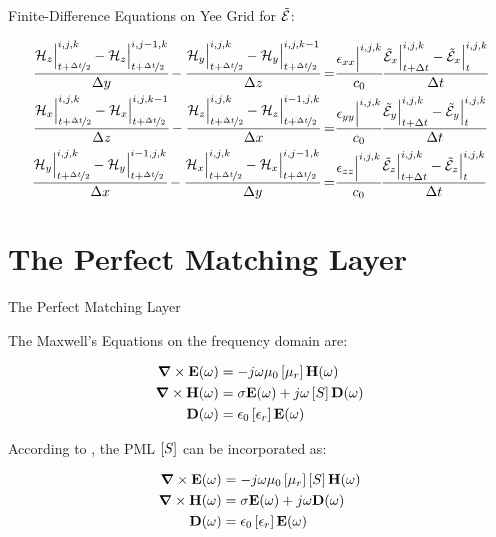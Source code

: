 \documentclass[aspectratio=169]{beamer}
\begin{document}
\begin{frame}{Finite-Difference Equations on Yee Grid}
  for $\tilde{\mathcal{E}}$:

  \begin{small}
      \begin{align}
          \cfrac{\mathcal{H}_z\Big|^{i,j,k}_{t+\nicefrac{\Delta t}{2}}-\mathcal{H}_z\Big|^{i,j-1,k}_{t+\nicefrac{\Delta t}{2}}}{\Delta y} - \cfrac{\mathcal{H}_y\Big|^{i,j,k}_{t+\nicefrac{\Delta t}{2}}-\mathcal{H}_y\Big|^{i,j,k-1}_{t+\nicefrac{\Delta t}{2}}}{\Delta z} 
          =&
          \cfrac{\epsilon_{xx}\Big|^{i,j,k}}{c_0}\cfrac{\tilde{\mathcal{E}}_x\Big|^{i,j,k}_{t+\Delta t}-\tilde{\mathcal{E}}_x\Big|^{i,j,k}_{t}}{\Delta t}
          \label{eq:fd_ex}\\
          \cfrac{\mathcal{H}_x\Big|^{i,j,k}_{t+\nicefrac{\Delta t}{2}}-\mathcal{H}_x\Big|^{i,j,k-1}_{t+\nicefrac{\Delta t}{2}}}{\Delta z} - \cfrac{\mathcal{H}_z\Big|^{i,j,k}_{t+\nicefrac{\Delta t}{2}}-\mathcal{H}_z\Big|^{i-1,j,k}_{t+\nicefrac{\Delta t}{2}}}{\Delta x}  =&
          \cfrac{\epsilon_{yy}\Big|^{i,j,k}}{c_0}\cfrac{\tilde{\mathcal{E}}_y\Big|^{i,j,k}_{t+\Delta t}-\tilde{\mathcal{E}}_y\Big|^{i,j,k}_{t}}{\Delta t}
          \label{eq:fd_ey}\\
          \cfrac{\mathcal{H}_y\Big|^{i,j,k}_{t+\nicefrac{\Delta t}{2}}-\mathcal{H}_y\Big|^{i-1,j,k}_{t+\nicefrac{\Delta t}{2}}}{\Delta x} - \cfrac{\mathcal{H}_x\Big|^{i,j,k}_{t+\nicefrac{\Delta t}{2}}-\mathcal{H}_x\Big|^{i,j-1,k}_{t+\nicefrac{\Delta t}{2}}}{\Delta y} 
          =&
          \cfrac{\epsilon_{zz}\Big|^{i,j,k}}{c_0}\cfrac{\tilde{\mathcal{E}}_z\Big|^{i,j,k}_{t+\Delta t}-\tilde{\mathcal{E}}_z\Big|^{i,j,k}_{t}}{\Delta t}
          \label{eq:fd_ez}
      \end{align}
  \end{small}
\end{frame}

\section{The Perfect Matching Layer}
\begin{frame}{The Perfect Matching Layer}
  
  The Maxwell's Equations on the frequency domain are:

  \begin{align}
    \rot \E (\omega) &= -j\omega \mu_0 \brackets{\mu_r} \Hh (\omega) \\
    \rot \Hh (\omega) &= \sigma \E(\omega) + j\omega\brackets{S} \D (\omega) \\
    \D (\omega) &= \epsilon_0 \brackets{\epsilon _r}\E (\omega)
  \end{align}

  According to \cite{rumpf_book}, the PML $\brackets{S}$ can be incorporated as:

  \begin{align}
      \rot \E (\omega) &= -j\omega \mu_0 \brackets{\mu_r} \brackets{S} \Hh (\omega) \\
      \rot \Hh (\omega) &= \sigma \E(\omega) + j\omega \D (\omega) \\
      \D (\omega) &= \epsilon_0 \brackets{\epsilon _r} \E (\omega)
  \end{align}

\end{frame}
\end{document}
